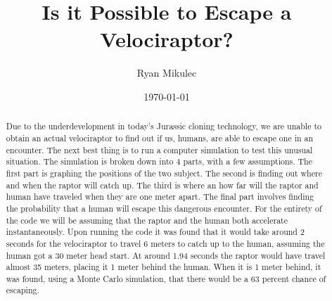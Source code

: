 \documentclass[twocolumn]{revtex4}
\begin{document}
\title{
Is it Possible to Escape a Velociraptor?
}

\author{Ryan Mikulec}
\date{\today}

\begin{abstract}
    Due to the underdevelopment in today's Jurassic cloning technology, we are unable to obtain  an 
    actual velociraptor to find out if us, humans, are able to escape one in an encounter.
    The next best thing is to run a computer simulation to test this
    unusual situation. The simulation is broken down into 4 parts, with a few assumptions.
    The first part is graphing the positions of the two subject. The second is finding out 
    where and when the raptor will catch up. The third is where an how far will the raptor 
    and human have traveled when they are one meter apart. The final part involves finding
    the probability that a human will escape this dangerous encounter. For the entirety of the
    code we will be assuming that the raptor and the human both accelerate instantaneously. Upon
    running the code it was found that it would take around 2 seconds for the velociraptor to 
    travel 6 meters to catch up to the human, assuming the human got a 30 meter head start. At
    around 1.94 seconds the raptor would have travel almost 35 meters, placing it 1 meter behind
    the human. When it is 1 meter behind, it was found, using a Monte Carlo simulation, that 
    there would be a 63 percent chance of escaping.
\end{abstract}

\maketitle

\end{document}
